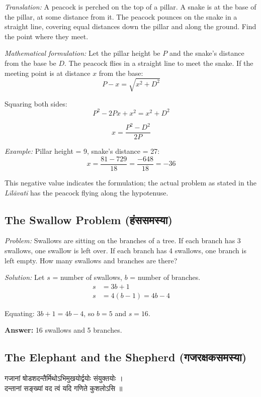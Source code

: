 \documentclass[10pt,a4paper]{article}
\newenvironment{sanskritverse}{%
  \begin{center}%
  \begin{minipage}{0.94\textwidth}%
  \centering\devanagarifont\small%
}{%
  \end{minipage}%
  \end{center}%
  \vspace{0.1em}%
}
\begin{document}
\textit{Translation:} A peacock is perched on the top of a pillar. A snake is at the base of the pillar, at some distance from it. The peacock pounces on the snake in a straight line, covering equal distances down the pillar and along the ground. Find the point where they meet.

\textit{Mathematical formulation:} Let the pillar height be $P$ and the snake's distance from the base be $D$. The peacock flies in a straight line to meet the snake. If the meeting point is at distance $x$ from the base:
\[
P - x = \sqrt{x^2 + D^2}
\]

Squaring both sides:
\[
P^2 - 2Px + x^2 = x^2 + D^2
\]

\[
x = \frac{P^2 - D^2}{2P}
\]

\textit{Example:} Pillar height = 9, snake's distance = 27:
\[
x = \frac{81 - 729}{18} = \frac{-648}{18} = -36
\]

This negative value indicates the formulation; the actual problem as stated in the \textit{Līlāvatī} has the peacock flying along the hypotenuse.

\subsection*{The Swallow Problem (हंससमस्या)}

\textit{Problem:} Swallows are sitting on the branches of a tree. If each branch has 3 swallows, one swallow is left over. If each branch has 4 swallows, one branch is left empty. How many swallows and branches are there?

\textit{Solution:} Let $s$ = number of swallows, $b$ = number of branches.
\begin{align*}
s &= 3b + 1 \\
s &= 4(b-1) = 4b - 4
\end{align*}

Equating: $3b + 1 = 4b - 4$, so $b = 5$ and $s = 16$.

\textbf{Answer:} 16 swallows and 5 branches.

\subsection*{The Elephant and the Shepherd (गजरक्षकसमस्या)}

\begin{sanskritverse}
गजानां षोडशदन्तैर्मिथोऽभिमुखयोर्द्वयोः संयुक्तयोः ।\\
दन्तानां सङ्ख्यां वद त्वं यदि गणिते कुशलोऽसि ॥
\end{sanskritverse}
\end{document}
